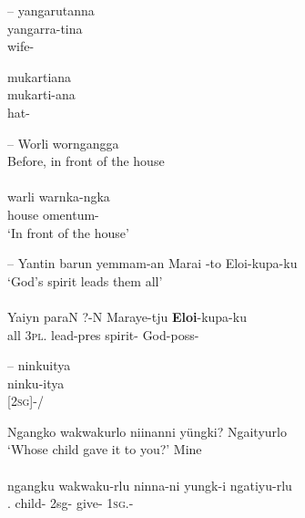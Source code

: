 \documentclass{langscibook}
\begin{document}
\begin{xlist}
--
\ea\label{ex:5:7}
  yangarutanna \\
\gll yangarra-tina \\
    wife-                            \\
\z



\ea\label{ex:5:8}
 mukartiana \\
\gll mukarti-ana\\
    hat-\\
\z




--
\ea\label{ex:5:9}
Worli    worngangga \\
Before, in front of the house \\
\citep{teichelmann_dictionary_1857} \\
\gll warli warnka-ngka \\
house   omentum- \\
\glt `In front of the house'
\z



--
\ea\label{ex:5:10}
Yantin   barun            yemmam-an         Marai -to             Eloi-kupa-ku \\
\glt `God’s spirit leads them all' \\
\citep{threlkeld_australian_1834} \\
\gll Yaiyn   paraN            ?-N                  Maraye-tju      \textbf{Eloi}-kupa-ku \\
        all           3\textsc{pl}. 	  lead-pres           spirit-       God-poss-\\
\z




--
\ea\label{ex:5:11}
ninkuitya \\
\gll ninku-itya \\
{}[2\textsc{sg}]-/                         \\
\z

      	  

          


\ea\label{ex:5:12}
Ngangko   		wakwakurlo 	  niinanni   yüngki?	      Ngaityurlo \\
\glt `Whose child gave it to you?'						Mine \\
\citep[12]{teichelmann_outlines_1840} \\
\gll ngangku    		wakwaku-rlu 	 ninna-ni            yungk-i	       ngatiyu-rlu \\
 .    	  	child-   	 2sg-          give-      1\textsc{sg}.-                                \\
\z


\end{xlist}
\end{document}
